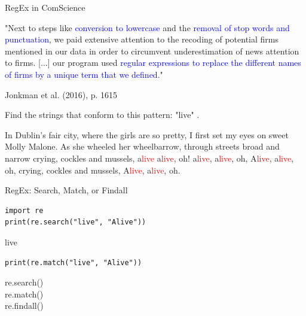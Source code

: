 \documentclass[handout]{beamer}
\begin{document}
\begin{frame}[fragile]{RegEx in ComScience}
	
	\begin{small}
		"Next to steps like \textcolor{blue}{conversion to lowercase} and the  \textcolor{blue}{removal of stop words and punctuation}, we paid extensive attention to the recoding of potential firms mentioned in our data in order to circumvent underestimation of news attention to firms. [...] our program used \textcolor{blue}{regular expressions to replace the different names of firms by a unique term that we defined}."
	\end{small}
	\begin{tiny}
		Jonkman et al. (2016), p. 1615 
	\end{tiny}
	
\end{frame}



\begin{frame}
	
	Find the strings that conform to this pattern: "live" . 
	
	In Dublin's fair city, where the girls are so pretty, I first set my eyes on sweet Molly Malone. As she wheeled her wheelbarrow, through streets broad and narrow crying, cockles and mussels, a\textcolor{red}{live} a\textcolor{red}{live}, oh! a\textcolor{red}{live}, a\textcolor{red}{live}, oh, A\textcolor{red}{live}, a\textcolor{red}{live}, oh, crying, cockles and mussels, A\textcolor{red}{live}, a\textcolor{red}{live}, oh.
\end{frame}



\begin{frame}[fragile]{RegEx: Search, Match, or Findall}
	
\begin{lstlisting}
import re
print(re.search("live", "Alive"))
\end{lstlisting}
	
\begin{lstlistingoutput}
live
\end{lstlistingoutput}

\begin{lstlisting}
print(re.match("live", "Alive"))
\end{lstlisting}

\begin{lstlistingoutput}
 
\end{lstlistingoutput}


re.search() \\
re.match() \\
re.findall()

	
\end{frame}
\end{document}
